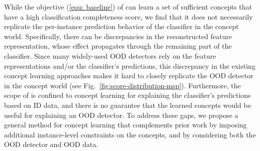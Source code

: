 While the objective (\ref{equ: baseline}) of \citeauthor{yeh2020completeness} can learn a set of sufficient concepts that have a high classification completeness score, we find that it does not necessarily replicate the per-instance prediction behavior of the classifier in the concept world. 
Specifically, there can be discrepancies in the reconstructed feature representation, whose effect propagates through the remaining part of the classifier. %
Since many widely-used OOD detectors rely on the feature representations and/or the classifier's predictions, this discrepancy in the existing concept learning approaches makes it hard to closely replicate the OOD detector in the concept world (see Fig.~\ref{fig:score-distribution-msp}).
%
Furthermore, the scope of \citeauthor{yeh2020completeness} is confined to concept learning for explaining the classifier's predictions based on ID data, and there is no guarantee that the learned concepts would be useful for explaining an OOD detector. 
%
To address these gaps, we propose a general method for concept learning that complements prior work by imposing additional instance-level constraints on the concepts, and by considering both the OOD detector and OOD data.
%

\iffalse

